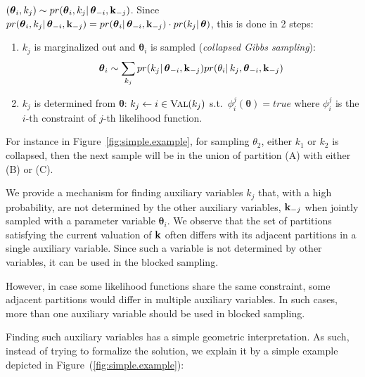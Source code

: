 $
(\boldsymbol\theta_i, k_j) \sim pr(\boldsymbol\theta_i, k_j | \, \boldsymbol 
\theta_{-i}, 
\textbf{k}_{-j})  
$.
Since 
$pr(\boldsymbol\theta_i, k_j | \, \boldsymbol \theta_{-i}, \textbf{k}_{-j}) = 
pr(\boldsymbol\theta_i | \, \boldsymbol \theta_{-i}, \textbf{k}_{-j})\cdot pr(k_j 
| \, \boldsymbol\theta)$,  
this is done in 2 steps:
\begin{enumerate}
\item 
$k_j$ is marginalized out and $\boldsymbol\theta_i$ is sampled (\emph{collapsed 
Gibbs sampling}):
$$
\boldsymbol\theta_i \sim \sum_{k_j} 
pr(k_j | \, \boldsymbol \theta_{-i}, \textbf{k}_{-j}) 
pr(\theta_i | \, k_j, \boldsymbol \theta_{-i}, \textbf{k}_{-j})  
$$
\item
$k_j$ is determined from $\boldsymbol \theta$:
$k_j \leftarrow i \in \textsc{Val}(k_j)$ s.t.\ $\phi_i^j(\boldsymbol \theta) = \textit{true}$
where $\phi_i^j$ is the $i$-th constraint of $j$-th likelihood function.
\end{enumerate}

For instance in Figure~\ref{fig:simple.example}, for sampling $\theta_2$, 
either $k_1$ or $k_2$ is collapsed,
then the next sample will be in the union of partition (A) with either (B) or (C). 

We provide a mechanism for finding auxiliary variables $k_j$ that, with a high  
probability, are not determined by the other auxiliary variables, 
$\textbf{k}_{-j}$ when jointly sampled with a parameter variable 
$\boldsymbol\theta_i$. 
We observe that the set of partitions satisfying the current valuation of $\textbf{k}$
often differs with its adjacent partitions in a single auxiliary variable.
Since such a variable is not determined by other variables, it can be used in 
the blocked sampling.

However, in case some likelihood functions share the same constraint, some 
adjacent partitions would differ in multiple auxiliary variables.
In such cases, more than one auxiliary variable should be used in blocked sampling.

Finding such auxiliary variables has a simple geometric interpretation. As 
such, instead of trying to formalize the solution, we explain it by a simple 
example depicted in Figure~(\ref{fig:simple.example}): 

